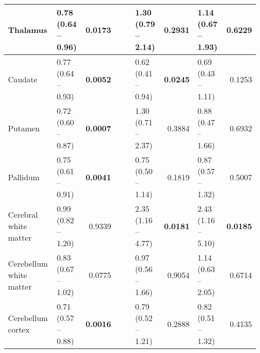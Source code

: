 \begin{sidewaystable}
{\begin{tabular}{|l|lr|lr|lr|lr|}
\hline
Thalamus & \textcolor[rgb]{0.2,0.2,0.2}{0.78 (0.64 -- 0.96)} & \textcolor[rgb]{0.2,0.2,0.2}{\textbf{0.0173}} & {\cellcolor[rgb]{0.753,0.753,0.753}} & {\cellcolor[rgb]{0.753,0.753,0.753}} & \textcolor[rgb]{0.2,0.2,0.2}{1.30 (0.79 -- 2.14)} & \textcolor[rgb]{0.2,0.2,0.2}{0.2931} & \textcolor[rgb]{0.2,0.2,0.2}{1.14 (0.67 -- 1.93)} & \textcolor[rgb]{0.2,0.2,0.2}{0.6229} \\ 
\hline
Caudate & \textcolor[rgb]{0.2,0.2,0.2}{0.77 (0.64 -- 0.93)} & \textcolor[rgb]{0.2,0.2,0.2}{\textbf{0.0052}} & {\cellcolor[rgb]{0.753,0.753,0.753}} & {\cellcolor[rgb]{0.753,0.753,0.753}} & \textcolor[rgb]{0.2,0.2,0.2}{0.62 (0.41 -- 0.94)} & \textcolor[rgb]{0.2,0.2,0.2}{\textbf{0.0245}} & \textcolor[rgb]{0.2,0.2,0.2}{0.69 (0.43 -- 1.11)} & \textcolor[rgb]{0.2,0.2,0.2}{0.1253} \\ 
\hline
Putamen & \textcolor[rgb]{0.2,0.2,0.2}{0.72 (0.60 -- 0.87)} & \textcolor[rgb]{0.2,0.2,0.2}{\textbf{0.0007}} & {\cellcolor[rgb]{0.753,0.753,0.753}} & {\cellcolor[rgb]{0.753,0.753,0.753}} & \textcolor[rgb]{0.2,0.2,0.2}{1.30 (0.71 -- 2.37)} & \textcolor[rgb]{0.2,0.2,0.2}{0.3884} & \textcolor[rgb]{0.2,0.2,0.2}{0.88 (0.47 -- 1.66)} & \textcolor[rgb]{0.2,0.2,0.2}{0.6932} \\ 
\hline
Pallidum & \textcolor[rgb]{0.2,0.2,0.2}{0.75 (0.61 -- 0.91)} & \textcolor[rgb]{0.2,0.2,0.2}{\textbf{0.0041}} & {\cellcolor[rgb]{0.753,0.753,0.753}} & {\cellcolor[rgb]{0.753,0.753,0.753}} & \textcolor[rgb]{0.2,0.2,0.2}{0.75 (0.50 -- 1.14)} & \textcolor[rgb]{0.2,0.2,0.2}{0.1819} & \textcolor[rgb]{0.2,0.2,0.2}{0.87 (0.57 -- 1.32)} & \textcolor[rgb]{0.2,0.2,0.2}{0.5007} \\ 
\hline
Cerebral white matter & \textcolor[rgb]{0.2,0.2,0.2}{0.99 (0.82 -- 1.20)} & \textcolor[rgb]{0.2,0.2,0.2}{0.9339} & {\cellcolor[rgb]{0.753,0.753,0.753}} & {\cellcolor[rgb]{0.753,0.753,0.753}} & \textcolor[rgb]{0.2,0.2,0.2}{2.35 (1.16 -- 4.77)} & \textcolor[rgb]{0.2,0.2,0.2}{\textbf{0.0181}} & \textcolor[rgb]{0.2,0.2,0.2}{2.43 (1.16 -- 5.10)} & \textcolor[rgb]{0.2,0.2,0.2}{\textbf{0.0185}} \\ 
\hline
Cerebellum white matter & \textcolor[rgb]{0.2,0.2,0.2}{0.83 (0.67 -- 1.02)} & \textcolor[rgb]{0.2,0.2,0.2}{0.0775} & {\cellcolor[rgb]{0.753,0.753,0.753}} & {\cellcolor[rgb]{0.753,0.753,0.753}} & \textcolor[rgb]{0.2,0.2,0.2}{0.97 (0.56 -- 1.66)} & \textcolor[rgb]{0.2,0.2,0.2}{0.9054} & \textcolor[rgb]{0.2,0.2,0.2}{1.14 (0.63 -- 2.05)} & \textcolor[rgb]{0.2,0.2,0.2}{0.6714} \\ 
\hline
Cerebellum cortex & \textcolor[rgb]{0.2,0.2,0.2}{0.71 (0.57 -- 0.88)} & \textcolor[rgb]{0.2,0.2,0.2}{\textbf{0.0016}} & {\cellcolor[rgb]{0.753,0.753,0.753}} & {\cellcolor[rgb]{0.753,0.753,0.753}} & \textcolor[rgb]{0.2,0.2,0.2}{0.79 (0.52 -- 1.21)} & \textcolor[rgb]{0.2,0.2,0.2}{0.2888} & \textcolor[rgb]{0.2,0.2,0.2}{0.82 (0.51 -- 1.32)} & \textcolor[rgb]{0.2,0.2,0.2}{0.4135} \\ 

\end{tabular}}
\end{sidewaystable}
